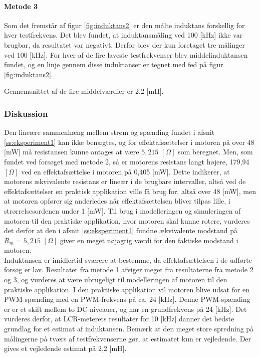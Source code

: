 \paragraph{Metode 3\\}
Som det fremstår af figur \ref{fig:induktans2} er den målte induktans forskellig for hver testfrekvens.
Det blev fundet, at induktansmåling ved 100 [kHz] ikke var brugbar, da resultatet var negativt.
Derfor blev der kun foretaget tre målinger ved 100 [kHz].
For hver af de fire laveste testfrekvenser blev middelinduktansen fundet, og
en linje gennem disse induktanser er tegnet med fed på figur \ref{fig:induktans2}.

Gennemsnittet af de fire middelværdier er 2,2 [mH].

\subsubsection{Diskussion}
Den lineære sammenhæng mellem strøm og spænding fundet i afsnit \ref{ss:eksperiment1} kan ikke benægtes,
og for effektafsættelser i motoren på over 48 [mW] må resistansen kunne antages at være \(5,215\) \([\Omega]\)  som beregnet.
Men, som fundet ved forsøget med metode 2, så er motorens resistans langt højere,
179,94 \([\Omega]\) ved en effektafsættelse i motoren på 0,405 [mW].
Dette indikerer, at motorens ækvivalente resistans er lineær i de brugbare intervaller, altså ved de effektafsættelser en
praktisk applikation ville få brug for, altså over 48 [mW], men at motoren opfører sig anderledes når effektafsættelsen
bliver tilpas lille, i strørrelsesordenen under 1 [mW].
Til brug i modelleringen og simuleringen af motoren til den praktiske applikation, hvor motoren skal kunne rotere,
vurderes det derfor at den i afsnit \ref{ss:eksperiment1} fundne ækvivalente modstand på \(R_m=5,215\) \([\Omega]\) giver en meget nøjagtig værdi for den faktiske modstand i motoren.\\

Induktansen er imidlertid sværere at bestemme, da effektafsættelsen i de udførte forsøg er lav.
Resultatet fra metode 1 afviger meget fra resultaterne fra metode 2 og 3, og vurderes at være ubrugeligt
til modelleringen af motoren til den praktiske applikation.
I den praktiske applikation vil motoren blive udsat for en PWM-spænding med en PWM-frekvens på ca. 24 [kHz].
Denne PWM-spænding er er et skift mellem to DC-niveauer, og har en grundfrekvens på 24 [kHz].
Det vurderes derfor, at LCR-meterets resultater for 10 [kHz] danner det bedste grundlag for et
estimat af induktansen. Bemærk at den meget store spredning på målingerne på tværs af testfrekvenserne
gør, at estimatet kun er vejledende.
Der gives et vejledende estimat på 2,2 [mH].


